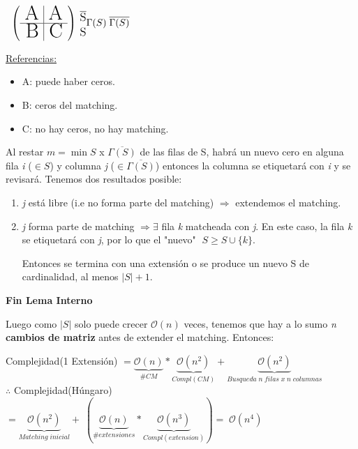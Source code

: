 \documentclass[12pt,a4paper]{report}
\begin{document}
\begin{enumerate}
				\begin{center}$
				\; \; \left(
				\begin{array}{r | r}
					\text{{\huge A}} & \text{{\huge A}} \\
					\hline
					\text{{\huge B}} & \text{{\huge C}}
				\end{array}
				\right)
				{\begin{subarray}{l} \; \overline{\text{{\large S}}} \\ \\ \; {\text{{\large S}}} \end{subarray}} \linebreak
				\Gamma(S) \; \overline{\Gamma(S)}
				$
				\end{center}

				\underline{Referencias:}
				\begin{itemize}
					\item A: puede haber ceros.
					\item B: ceros del matching.
					\item C: no hay ceros, no hay matching.
				\end{itemize}

				Al restar $\textit{m} = \min S$ x $\overline{\Gamma(S)}$ de las filas de S, habrá un nuevo cero en alguna fila \textit{i} ($\in S$) y columna \textit{j} ($\in \overline{\Gamma(S)}$) entonces la columna se etiquetará con \textit{i} y se revisará.
				Tenemos dos resultados posible:
				\begin{enumerate}
					\item \textit{j} está libre (i.e no forma parte del matching) $\Rightarrow$ extendemos el matching.
					\item \textit{j} forma parte de matching $\Rightarrow \exists$ fila \textit{k} matcheada con \textit{j}. En este caso, la fila \textit{k} se etiquetará con \textit{j}, por lo que el "nuevo" $\; S \geq S \cup \{\textit{k}\}$.

					\vspace{5mm}
					Entonces se termina con una extensión o se produce un nuevo S de cardinalidad, al menos $\lvert S \rvert + 1$.
				\end{enumerate}

				\textbf{Fin Lema Interno}

				Luego como $\lvert S \rvert$ solo puede crecer $\mathcal{O}(n)$ veces, tenemos que hay a lo sumo \textit{n} \textbf{cambios de matriz} antes de extender el matching. Entonces:

							\begin{center}
								Complejidad(1 Extensión) $= \underbrace{\mathcal{O}(n)}_{\# CM} * \underbrace{\mathcal{O}(n^{2})}_{Compl(CM)} + \underbrace{\mathcal{O}(n^{2})}_{Busqueda \; \textit{n} \; filas \; x \; \textit{n} \; columnas }$ \\
								\vspace{5mm}
								$\therefore$ Complejidad(Húngaro) $= \underbrace{\mathcal{O}(n^{2})}_{Matching \; inicial} + \; (\underbrace{\mathcal{O}(n)}_{\#extensiones} * \underbrace{\mathcal{O}(n^{3})}_{Compl(extension)}) = \; \mathcal{O}(n^{4})$
							\end{center}
			\end{enumerate}
\end{document}
